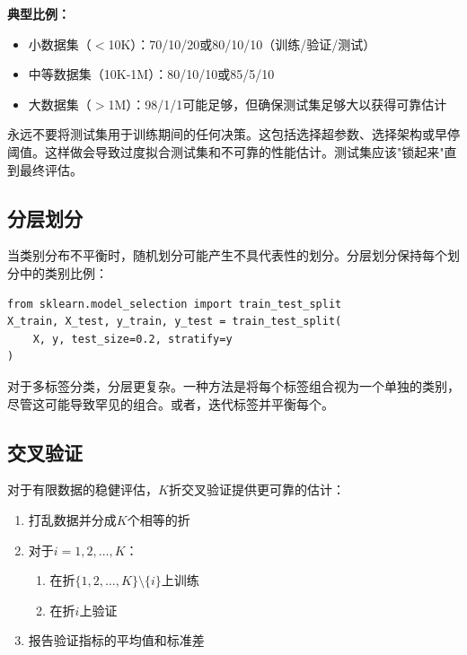 \textbf{典型比例：}
\begin{itemize}
    \item 小数据集（$<$10K）：70/10/20或80/10/10（训练/验证/测试）
    \item 中等数据集（10K-1M）：80/10/10或85/5/10
    \item 大数据集（$>$1M）：98/1/1可能足够，但确保测试集足够大以获得可靠估计
\end{itemize}

\begin{note}[测试集泄露]
永远不要将测试集用于训练期间的任何决策。这包括选择超参数、选择架构或早停阈值。这样做会导致过度拟合测试集和不可靠的性能估计。测试集应该"锁起来"直到最终评估。
\end{note}

\subsection{分层划分}

当类别分布不平衡时，随机划分可能产生不具代表性的划分。分层划分保持每个划分中的类别比例：

\begin{verbatim}
from sklearn.model_selection import train_test_split
X_train, X_test, y_train, y_test = train_test_split(
    X, y, test_size=0.2, stratify=y
)
\end{verbatim}

对于多标签分类，分层更复杂。一种方法是将每个标签组合视为一个单独的类别，尽管这可能导致罕见的组合。或者，迭代标签并平衡每个。

\subsection{交叉验证}

对于有限数据的稳健评估，$K$折交叉验证提供更可靠的估计：

\begin{algorithm}[H]
\caption[$K$折交叉验证]{$K$折交叉验证}
\begin{enumerate}
    \item 打乱数据并分成$K$个相等的折
    \item 对于$i = 1, 2, \ldots, K$：
    \begin{enumerate}
        \item 在折$\{1, 2, \ldots, K\} \setminus \{i\}$上训练
        \item 在折$i$上验证
    \end{enumerate}
    \item 报告验证指标的平均值和标准差
\end{enumerate}
\end{algorithm}

